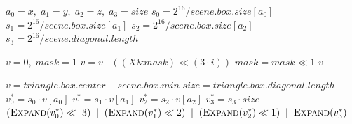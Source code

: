 \begin{algorithm}[H]
\caption{Pseudocode of the 64-bit EMC variant 2 generation. \cite{Vinkler2017}}
\label{alg:emc64var1}
\begin{algorithmic}[1]

  \State $a_0 = x,\; a_1 = y,\; a_2 = z,\; a_3 = size$
  \State {} 
  \State $s_0 = 2^{16} / scene.box.size[a_0]$
  \State $s_1 = 2^{16} / scene.box.size[a_1]$
  \State $s_2 = 2^{16} / scene.box.size[a_2]$
  \State $s_3 = 2^{16} / scene.diagonal.length$
\EndFunction

  \State $v = 0,\; mask = 1$
    \State $v = v \mid ((X \& mask) \ll (3 \cdot  i))$
    \State $mask = mask \ll 1$
  \EndFor
  \State \Return $v$
\EndFunction

  \State $v = triangle.box.center-scene.box.min$
  \State $size = triangle.box.diagonal.length$
  \State $v^*_0 = s_0 \cdot v[a_0]$
  \State $v^*_1 = s_1 \cdot v[a_1]$
  \State $v^*_2 = s_2 \cdot v[a_2]$
  \State $v^*_3 = s_3 \cdot size$
  \State \Return 
    $(\Call{Expand}{v^*_0} \ll~3) \;\mid\; 
      (\Call{Expand}{v^*_1} \ll 2) \;\mid\; 
      (\Call{Expand}{v^*_2} \ll 1) \;\mid\; 
      \Call{Expand}{v^*_3}$
\EndFunction

\end{algorithmic}
\end{algorithm}


